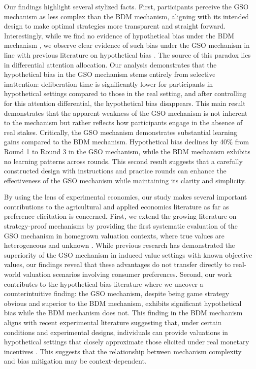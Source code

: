 \documentclass[12pt]{article}
\begin{document}
Our findings highlight several stylized facts. First, participants perceive the GSO mechanism as less complex than the BDM mechanism, aligning with its intended design to make optimal strategies more transparent and straight forward. Interestingly, while we find no evidence of hypothetical bias under the BDM mechanism \citep{branas-garza_paid_2023, drichoutis_incentives_2025}, we observe clear evidence of such bias under the GSO mechanism in line with previous literature on  hypothetical bias \citep{loomis_whats_2011, penn2018understanding}. 
The source of this paradox lies in differential attention allocation. Our analysis demonstrates that the hypothetical bias in the GSO mechanism stems entirely from selective inattention: deliberation time is significantly lower for participants in hypothetical settings compared to those in the real setting, and after controlling for this attention differential, the hypothetical bias disappears. This main result demonstrates that the apparent weakness of the GSO mechanism  is not inherent to the mechanism but rather reflects how participants engage in the absence of real stakes. Critically, the GSO mechanism demonstrates substantial learning gains compared to the BDM mechanism. Hypothetical bias declines by 40\% from Round 1 to Round 3 in the GSO mechanism, while the BDM mechanism exhibits no learning patterns across rounds. This second result suggests that a carefully constructed design with instructions and practice rounds can enhance the effectiveness of the GSO mechanism while maintaining its clarity and simplicity.


By using the lens of experimental economics, our study makes several important contributions to the  agricultural and applied economics literature as far as preference elicitation is concerned. First, we extend the growing literature on strategy-proof mechanisms by providing the first systematic evaluation of the GSO mechanism in homegrown valuation contexts, where true values are heterogeneous and unknown \citep{li_obviously_2017, pycia_theory_2023, chakraborty_future_2025}. While previous research has demonstrated the superiority of the GSO mechanism in induced value settings with known objective values, our findings reveal that these advantages do not transfer directly to real-world valuation scenarios involving consumer preferences. Second, our work contributes to the hypothetical bias literature \citep{penn2018understanding, cummings1999unbiased, loomis_whats_2011, fang_use_2021, list2001explicit, grebitus2013explaining} where we uncover a counterintuitive finding: the GSO mechanism, despite being game strategy obvious and superior to the BDM mechanism, exhibits significant hypothetical bias while the BDM mechanism does not. This finding in the BDM mechanism aligns with recent experimental literature suggesting that, under certain conditions and experimental designs, individuals can provide valuations in hypothetical settings that closely approximate those elicited under real monetary incentives \citep{branas-garza_paid_2023, drichoutis_incentives_2025, hackethal2023role}. This suggests that the relationship between mechanism complexity and bias mitigation may be context-dependent.
\end{document}
